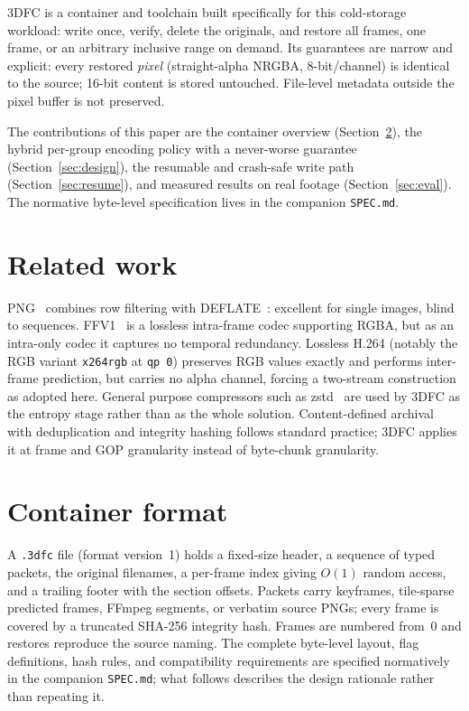 \documentclass[11pt,a4paper]{article}
\begin{document}
3DFC is a container and toolchain built specifically for this cold-storage
workload: write once, verify, delete the originals, and restore all frames, one
frame, or an arbitrary inclusive range on demand. Its guarantees are narrow and
explicit: every restored \emph{pixel} (straight-alpha NRGBA, 8-bit/channel) is
identical to the source; 16-bit content is stored untouched. File-level
metadata outside the pixel buffer is not preserved.

The contributions of this paper are the container overview
(Section~\ref{sec:format}), the hybrid per-group encoding policy with a
never-worse guarantee (Section~\ref{sec:design}), the resumable and crash-safe
write path (Section~\ref{sec:resume}), and measured results on real footage
(Section~\ref{sec:eval}). The normative byte-level specification lives in the
companion \texttt{SPEC.md}.

\section{Related work}
\label{sec:related}

PNG~\cite{png} combines row filtering with DEFLATE~\cite{deflate}: excellent for single
images, blind to sequences. FFV1~\cite{ffv1} is a lossless intra-frame codec
supporting RGBA, but as an intra-only codec it captures no temporal redundancy.
Lossless H.264 (notably the RGB variant \texttt{x264rgb} at \texttt{qp~0})
preserves RGB values exactly and performs inter-frame prediction, but carries
no alpha channel, forcing a two-stream construction as adopted here. General
purpose compressors such as zstd~\cite{zstd} are used by 3DFC as the entropy
stage rather than as the whole solution. Content-defined archival with
deduplication and integrity hashing follows standard practice; 3DFC applies it
at frame and GOP granularity instead of byte-chunk granularity.

\section{Container format}
\label{sec:format}

A \texttt{.3dfc} file (format version~1) holds a fixed-size header, a sequence
of typed packets, the original filenames, a per-frame index giving $O(1)$
random access, and a trailing footer with the section offsets. Packets carry
keyframes, tile-sparse predicted frames, FFmpeg segments, or verbatim source
PNGs; every frame is covered by a truncated SHA-256 integrity hash. Frames are
numbered from~0 and restores reproduce the source naming. The complete
byte-level layout, flag definitions, hash rules, and compatibility requirements
are specified normatively in the companion \texttt{SPEC.md}; what follows
describes the design rationale rather than repeating it.
\end{document}
